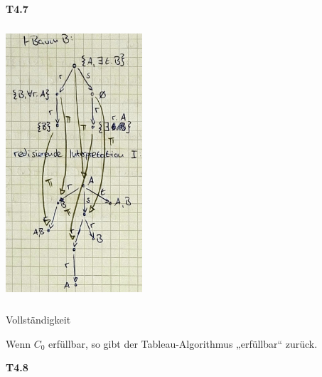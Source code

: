 \textbf{T4.7}

\includegraphics[width=2.0in,height=4.0in]{media/47real.png}

\begin{proposition}{Vollständigkeit}

Wenn $C_{0}$ erfüllbar, so gibt der Tableau-Algorithmus „erfüllbar``
zurück.
\end{proposition}

\textbf{T4.8}

